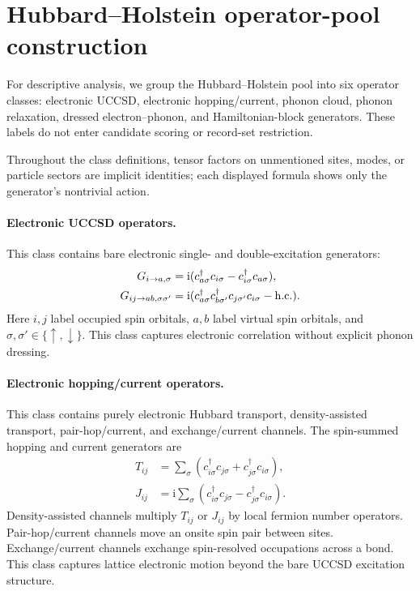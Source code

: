 \documentclass[
  reprint,
  amsmath,
  amssymb,
  aps,
  pra,
  nofootinbib,
  superscriptaddress,
  floatfix
]{revtex4-2}
\newcommand{\ii}{\mathrm{i}}
\begin{document}
\section{Hubbard--Holstein operator-pool construction}
\label{app:hh_operator_pool}
%
\noindent
For descriptive analysis, we group the Hubbard--Holstein pool into six operator
classes: electronic UCCSD, electronic hopping/current, phonon cloud,
phonon relaxation, dressed electron--phonon, and Hamiltonian-block generators.
These labels do not enter candidate scoring or record-set restriction.

Throughout the class definitions, tensor factors on unmentioned sites, modes,
or particle sectors are implicit identities; each displayed formula shows only
the generator's nontrivial action.

\paragraph*{Electronic UCCSD operators.}
This class contains bare electronic single- and double-excitation generators:
\begin{align*}
G_{i\to a,\sigma}
&=
\ii(c_{a\sigma}^{\dagger}c_{i\sigma}
-c_{i\sigma}^{\dagger}c_{a\sigma}),\\
G_{ij\to ab,\sigma\sigma'}
&=
\ii(c_{a\sigma}^{\dagger}c_{b\sigma'}^{\dagger}
c_{j\sigma'}c_{i\sigma}
-{\rm h.c.}) .
\end{align*}
Here \(i,j\) label occupied spin orbitals, \(a,b\) label virtual spin orbitals,
and \(\sigma,\sigma'\in\{\uparrow,\downarrow\}\). This class captures
electronic correlation without explicit phonon dressing.

\paragraph*{Electronic hopping/current operators.}
This class contains purely electronic Hubbard transport, density-assisted
transport, pair-hop/current, and exchange/current channels. The spin-summed
hopping and current generators are
\begin{align*}
T_{ij}
&=
\sum_{\sigma}
(c_{i\sigma}^{\dagger}c_{j\sigma}
+c_{j\sigma}^{\dagger}c_{i\sigma}),\\
J_{ij}
&=
\ii\sum_{\sigma}
(c_{i\sigma}^{\dagger}c_{j\sigma}
-c_{j\sigma}^{\dagger}c_{i\sigma}) .
\end{align*}
Density-assisted channels multiply \(T_{ij}\) or \(J_{ij}\) by local fermion
number operators. Pair-hop/current channels move an onsite spin pair between
sites. Exchange/current channels exchange spin-resolved occupations across a
bond. This class captures lattice electronic motion beyond the bare UCCSD
excitation structure.
\end{document}
